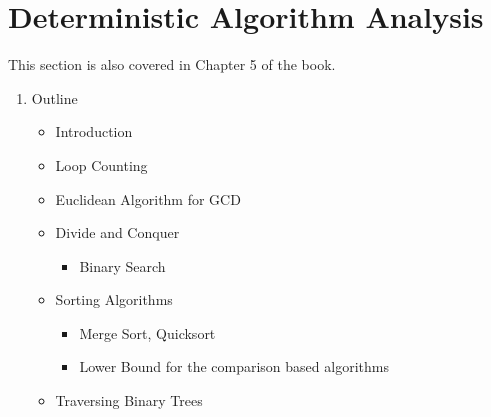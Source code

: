 

\section{Deterministic Algorithm Analysis}
This section is also covered in Chapter 5 of the book.
\begin{enumerate}
\item Outline
  \begin{itemize}
  \item Introduction
  \item Loop Counting
  \item Euclidean Algorithm for GCD
  \item Divide and Conquer
    \begin{itemize}
    \item Binary Search
    \end{itemize}
  \item Sorting Algorithms
    \begin{itemize}
    \item Merge Sort, Quicksort
    \item Lower Bound for the comparison based algorithms
    \end{itemize}
  \item Traversing Binary Trees
  \end{itemize}

\end{enumerate}
